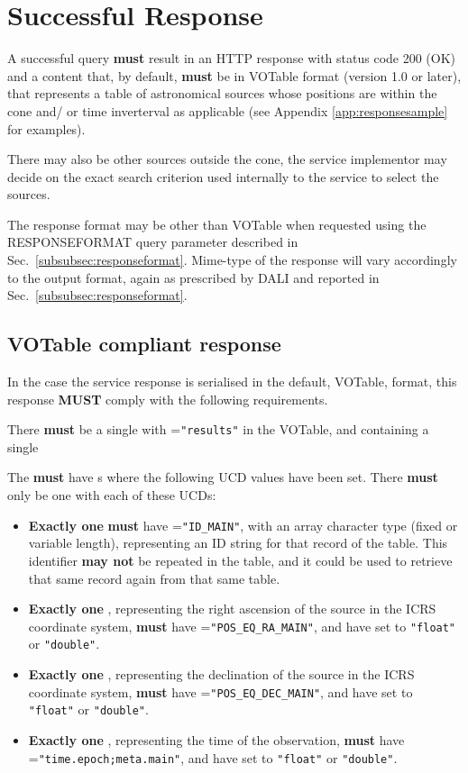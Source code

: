 \documentclass[11pt,a4paper]{ivoa} 
\begin{document}
\section{Successful Response} \label{sec:response} A successful query
\textbf{must} result in an HTTP response with status code 200 (OK) and a
content that, by default, \textbf{must} be in VOTable format (version
1.0 or later), that represents a table of astronomical sources whose
positions are within the cone and/ or time inverterval as applicable
(see Appendix \ref{app:responsesample} for examples).

There may also be other sources outside the cone, the service
implementor may decide on the exact search criterion used internally to
the service to select the sources.

The response format may be other than VOTable when requested using the
RESPONSEFORMAT query parameter described in
Sec.~\ref{subsubsec:responseformat}. Mime-type of the response will vary
accordingly to the output format, again as prescribed by DALI and
reported in Sec.~\ref{subsubsec:responseformat}.

\subsection{VOTable compliant response}

In the case the service response is serialised in the default, VOTable,
format, this response \textbf{MUST} comply with the following
requirements.

There \textbf{must} be a single  with
=\texttt{"results"} in
the VOTable, and containing a single 

The  \textbf{must} have s where the following
UCD values have been set. There \textbf{must} only be one 
with each of these UCDs: \begin{itemize} \item \textbf{Exactly one}
 \textbf{must} have =\texttt{"ID\_MAIN"}, with
an array character type (fixed or variable length), representing an ID
string for that record of the table. This identifier \textbf{may not} be
repeated in the table, and it could be used to retrieve that same record
again from that same table.  \item \textbf{Exactly one} ,
representing the right ascension of the source in the ICRS coordinate
system, \textbf{must} have =\texttt{"POS\_EQ\_RA\_MAIN"}, and have
 set to \texttt{"float"} or \texttt{"double"}.  \item
\textbf{Exactly one} , representing the declination of the
source in the ICRS coordinate system, \textbf{must} have
=\texttt{"POS\_EQ\_DEC\_MAIN"}, and have  set to \texttt{"float"}
or \texttt{"double"}.  \item \textbf{Exactly one} ,
representing the time of the observation, \textbf{must} have
=\texttt{"time.epoch;meta.main"}, and have 
set to \texttt{"float"} or \texttt{"double"}. 

\end{itemize}
\end{document}
